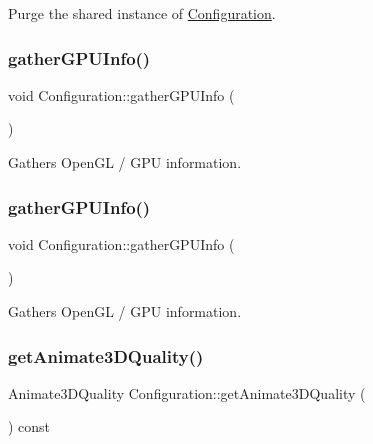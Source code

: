 Purge the shared instance of \hyperlink{classConfiguration}{Configuration}. \mbox{\label{classConfiguration_a708084005c949e65fe4ce442081cf89e}} 
\subsubsection{\texorpdfstring{gather\+G\+P\+U\+Info()}{gatherGPUInfo()}\hspace{0.1cm}{\footnotesize\ttfamily [1/2]}}
{\footnotesize\ttfamily void Configuration\+::gather\+G\+P\+U\+Info (\begin{DoxyParamCaption}{ }\end{DoxyParamCaption})}

Gathers Open\+GL / G\+PU information. \mbox{\label{classConfiguration_a708084005c949e65fe4ce442081cf89e}} 
\subsubsection{\texorpdfstring{gather\+G\+P\+U\+Info()}{gatherGPUInfo()}\hspace{0.1cm}{\footnotesize\ttfamily [2/2]}}
{\footnotesize\ttfamily void Configuration\+::gather\+G\+P\+U\+Info (\begin{DoxyParamCaption}{ }\end{DoxyParamCaption})}

Gathers Open\+GL / G\+PU information. \mbox{\label{classConfiguration_aa7340d160089d9f6de0ebc916740c3c1}} 
\subsubsection{\texorpdfstring{get\+Animate3\+D\+Quality()}{getAnimate3DQuality()}\hspace{0.1cm}{\footnotesize\ttfamily [1/2]}}
{\footnotesize\ttfamily Animate3\+D\+Quality Configuration\+::get\+Animate3\+D\+Quality (\begin{DoxyParamCaption}{ }\end{DoxyParamCaption}) const}

